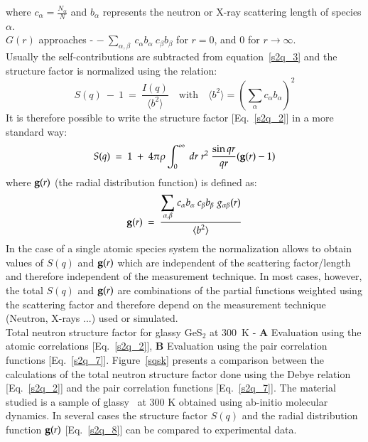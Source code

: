 where $c_{\alpha}=\displaystyle{\frac{N_\alpha}{N}}$ and $b_{\alpha}$ represents the neutron or X-ray scattering length of species $\alpha$. \\
$G(r)$ approaches - $\displaystyle{-\ \sum_{\alpha,\beta}}\ c_{\alpha} b_{\alpha}\ c_{\beta} b_{\beta}$ for $r = 0$, and 0 for $r\to\infty$. \\
Usually the self-contributions are subtracted from equation~\ref{s2q_3} and the structure factor is normalized using the relation:
\begin{equation}
\label{s2q_6}
S(q)\ -\ 1\ =\ \frac{I(q)}{\displaystyle{\langle b^{2} \rangle}}  \quad \text{with} \quad \langle b^{2} \rangle = \left(\sum_{\alpha} c_{\alpha} b_{\alpha} \right)^{2}
\end{equation}
It is therefore possible to write the structure factor [Eq.~\ref{s2q_2}] in a more standard way:
\begin{equation}
\label{s2q_7}
S(q)\ =\ 1\ +\ 4 \pi \rho \int_{0}^{\infty}\ dr\ r^{2}\ \frac{\sin qr}{qr} ({\bf{g}}(r) -1)
\end{equation}
where ${\bf{g}}(r)$ (the radial distribution function) is defined as:
\begin{equation}
\label{s2q_8}
{\bf{g}}(r)\ =\ \frac{\displaystyle{\sum_{\alpha,\beta}}\ c_{\alpha} b_{\alpha}\ c_{\beta} b_{\beta}\ g_{\alpha\beta}(r) }{\displaystyle{\langle b^{2} \rangle}}
\end{equation}
In the case of a single atomic species system the normalization allows to obtain values of $S(q)$ and ${\bf{g}}(r)$ which are independent of the scattering factor/length and therefore independent of the measurement technique. In most cases, however, the total $S(q)$ and ${\bf{g}}(r)$ are combinations of the partial functions weighted using the scattering factor and therefore depend on the measurement technique (Neutron, X-rays ...) used or simulated. \\
{Total neutron structure factor for glassy GeS$_2$ at 300~K - {\bf{A}} Evaluation using the atomic correlations [Eq.~\ref{s2q_2}], {\bf{B}} Evaluation using the pair correlation functions [Eq.~\ref{s2q_7}].}
\laf Figure~\ref{sqsk} presents a comparison between the calculations of the total neutron structure factor done using the Debye relation [Eq.~\ref{s2q_2}] and the pair correlation functions [Eq.~\ref{s2q_7}]. The material studied is a sample of glassy \ges\ at 300 K obtained using ab-initio molecular dynamics.
In several cases the structure factor $S(q)$ and the radial distribution function ${\bf{g}}(r)$ [Eq.~\ref{s2q_8}] can be compared to experimental data.
